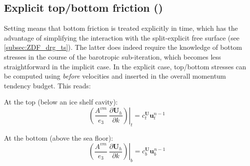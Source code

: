 \documentclass[../main/NEMO_manual]{subfiles}
\begin{document}
\subsection[Explicit top/bottom friction (\forcode{ln_drgimp=.false.})]{Explicit top/bottom friction (\protect{})}
\label{subsec:ZDF_drg_stability}

Setting  means that bottom friction is treated explicitly in time, which has the advantage of simplifying the interaction with the split-explicit free surface (see \autoref{subsec:ZDF_drg_ts}). The latter does indeed require the knowledge of bottom stresses in the course of the barotropic sub-iteration, which becomes less straightforward in the implicit case. In the explicit case, top/bottom stresses can be computed using \textit{before} velocities and inserted in the overall momentum tendency budget. This reads:

At the top (below an ice shelf cavity):
\[
  \left.{\left( {\frac{A^{vm} }{e_3 }\ \frac{\partial \textbf{U}_h}{\partial k}} \right)} \right|_{t}
  = c_{t}^{\textbf{U}}\textbf{u}^{n-1}_{t}
\]

At the bottom (above the sea floor):
\[
  \left.{\left( {\frac{A^{vm} }{e_3 }\ \frac{\partial \textbf{U}_h}{\partial k}} \right)} \right|_{b}
  = c_{b}^{\textbf{U}}\textbf{u}^{n-1}_{b}
\]
\end{document}
